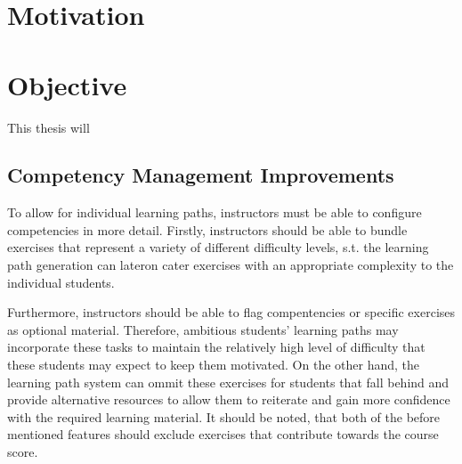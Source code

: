 \documentclass[a4paper,12pt,twoside]{article}
\begin{document}
\section{Motivation}


\section{Objective}

This thesis will

\subsection{Competency Management Improvements}
To allow for individual learning paths, instructors must be able to configure competencies in more detail. Firstly, instructors should be
able to bundle exercises that represent a variety of different difficulty levels, s.t. the learning path generation can lateron cater exercises
with an appropriate complexity to the individual students.

Furthermore, instructors should be able to flag compentencies or specific exercises as optional material. Therefore, ambitious students' learning paths
may incorporate these tasks to maintain the relatively high level of difficulty that these students may expect to keep them motivated.
On the other hand, the learning path system can ommit these exercises for students that fall behind and provide alternative resources to allow them
to reiterate and gain more confidence with the required learning material.
It should be noted, that both of the before mentioned features should exclude exercises that contribute towards the course score.
\end{document}
